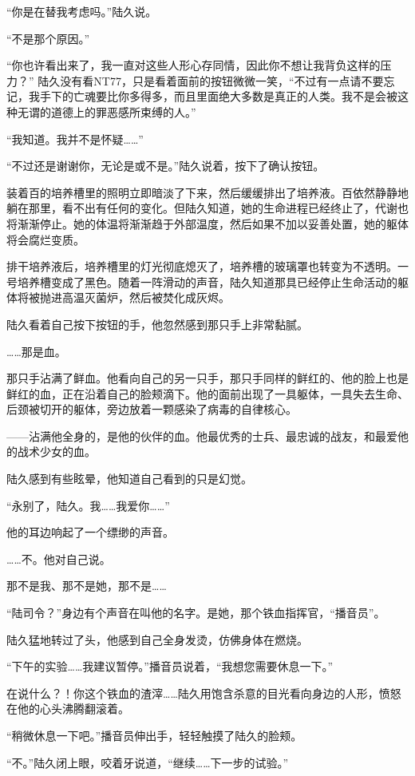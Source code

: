 “你是在替我考虑吗。”陆久说。

“不是那个原因。”

“你也许看出来了，我一直对这些人形心存同情，因此你不想让我背负这样的压力？” 陆久没有看NT77，只是看着面前的按钮微微一笑，“不过有一点请不要忘记，我手下的亡魂要比你多得多，而且里面绝大多数是真正的人类。我不是会被这种无谓的道德上的罪恶感所束缚的人。”

“我知道。我并不是怀疑……”

“不过还是谢谢你，无论是或不是。”陆久说着，按下了确认按钮。

装着百的培养槽里的照明立即暗淡了下来，然后缓缓排出了培养液。百依然静静地躺在那里，看不出有任何的变化。但陆久知道，她的生命进程已经终止了，代谢也将渐渐停止。她的体温将渐渐趋于外部温度，然后如果不加以妥善处置，她的躯体将会腐烂变质。

排干培养液后，培养槽里的灯光彻底熄灭了，培养槽的玻璃罩也转变为不透明。一号培养槽变成了黑色。随着一阵滑动的声音，陆久知道那具已经停止生命活动的躯体将被抛进高温灭菌炉，然后被焚化成灰烬。

陆久看着自己按下按钮的手，他忽然感到那只手上非常黏腻。

……那是血。

那只手沾满了鲜血。他看向自己的另一只手，那只手同样的鲜红的、他的脸上也是鲜红的血，正在沿着自己的脸颊滴下。他的面前出现了一具躯体，一具失去生命、后颈被切开的躯体，旁边放着一颗感染了病毒的自律核心。

——沾满他全身的，是他的伙伴的血。他最优秀的士兵、最忠诚的战友，和最爱他的战术少女的血。

陆久感到有些眩晕，他知道自己看到的只是幻觉。

“永别了，陆久。我……我爱你……”

他的耳边响起了一个缥缈的声音。

……不。他对自己说。

那不是我、那不是她，那不是……

“陆司令？”身边有个声音在叫他的名字。是她，那个铁血指挥官，“播音员”。

陆久猛地转过了头，他感到自己全身发烫，仿佛身体在燃烧。

“下午的实验……我建议暂停。”播音员说着，“我想您需要休息一下。”

在说什么？！你这个铁血的渣滓……陆久用饱含杀意的目光看向身边的人形，愤怒在他的心头沸腾翻滚着。

“稍微休息一下吧。”播音员伸出手，轻轻触摸了陆久的脸颊。

“不。”陆久闭上眼，咬着牙说道，“继续……下一步的试验。”\section*{}


